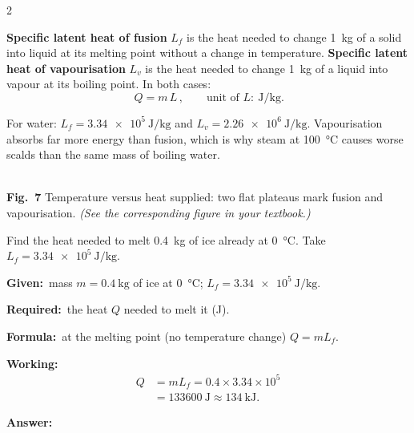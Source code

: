 \documentclass[10pt]{article}
\newcommand{\Given}{\par\vspace{2pt}\textbf{Given:}\ }
\newcommand{\Required}{\par\vspace{2pt}\textbf{Required:}\ }
\newcommand{\Formula}{\par\vspace{2pt}\textbf{Formula:}\ }
\newcommand{\Working}{\par\vspace{2pt}\textbf{Working:}}
\newcommand{\Answer}[1]{\par\vspace{2pt}\textbf{Answer:}\ \fbox{#1}}
\begin{document}
\begin{multicols}{2}
\begin{definition}
\textbf{Specific latent heat of fusion} $L_f$ is the heat needed to
change \SI{1}{\kilogram} of a solid into liquid at its melting point
without a change in temperature.
\textbf{Specific latent heat of vapourisation} $L_v$ is the heat needed
to change \SI{1}{\kilogram} of a liquid into vapour at its boiling
point. In both cases:
\[
  \boxed{\,Q = m\,L\,}, \qquad \text{unit of } L:\ \si{\joule\per\kilogram}.
\]
\end{definition}

\begin{nb}
For water: $L_f = \SI{3.34e5}{\joule\per\kilogram}$ and
$L_v = \SI{2.26e6}{\joule\per\kilogram}$. Vapourisation absorbs far more
energy than fusion, which is why steam at \SI{100}{\degreeCelsius}
causes worse scalds than the same mass of boiling water.
\end{nb}

\begin{center}
\\[2pt]
{\scriptsize\textbf{Fig.\ 7} Temperature versus heat supplied: two flat
plateaus mark fusion and vapourisation.
\textit{(See the corresponding figure in your textbook.)}}
\end{center}

\begin{example}
Find the heat needed to melt \SI{0.4}{\kilogram} of ice already at
\SI{0}{\degreeCelsius}. Take
$L_f = \SI{3.34e5}{\joule\per\kilogram}$.
\tcblower
\Given mass $m = \SI{0.4}{\kilogram}$ of ice at
\SI{0}{\degreeCelsius}; $L_f = \SI{3.34e5}{\joule\per\kilogram}$.
\Required the heat $Q$ needed to melt it (\si{\joule}).
\Formula at the melting point (no temperature change) $Q = m L_f$.
\Working
\begin{align*}
  Q &= m L_f = 0.4 \times 3.34\times10^{5} \\
    &= \SI{133600}{\joule} \approx \SI{134}{\kilo\joule}.
\end{align*}
\Answer{$Q \approx \SI{134}{\kilo\joule}$}
\end{example}


\end{multicols}
\end{document}
